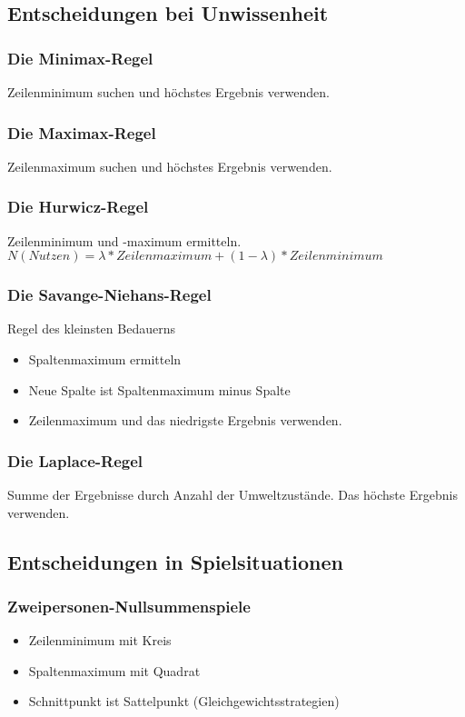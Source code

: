 \documentclass[a4paper,12pt]{scrartcl}
\begin{document}
\subsection{Entscheidungen bei Unwissenheit}
\subsubsection{Die Minimax-Regel}
Zeilenminimum suchen und höchstes Ergebnis verwenden.
\subsubsection{Die Maximax-Regel}
Zeilenmaximum suchen und höchstes Ergebnis verwenden.
\subsubsection{Die Hurwicz-Regel}
Zeilenminimum und -maximum ermitteln. \\
$N (Nutzen) = \lambda * Zeilenmaximum + (1 - \lambda) * Zeilenminimum $
\subsubsection{Die Savange-Niehans-Regel}
Regel des kleinsten Bedauerns \\ 
\begin{itemize}
\item Spaltenmaximum ermitteln
\item Neue Spalte ist Spaltenmaximum minus Spalte
\item Zeilenmaximum und das niedrigste Ergebnis verwenden.
\end{itemize}
\subsubsection{Die Laplace-Regel}
Summe der Ergebnisse durch Anzahl der Umweltzustände. Das höchste Ergebnis verwenden.

\subsection{Entscheidungen in Spielsituationen}
\subsubsection{Zweipersonen-Nullsummenspiele}
\begin{itemize}
\item Zeilenminimum mit Kreis
\item Spaltenmaximum mit Quadrat
\item Schnittpunkt ist Sattelpunkt (Gleichgewichtsstrategien)
\end{itemize}
\end{document}
